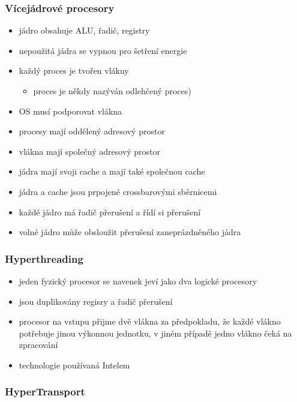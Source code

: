 \documentclass[a4paper,12pt]{article}
\providecommand{\tightlist}{%
\setlength{\itemsep}{0pt}\setlength{\parskip}{0pt}}
\begin{document}
\subsubsection{Vícejádrové procesory}

\begin{itemize}
\tightlist
\item jádro obsahuje ALU, řadič, registry
\item nepoužitá jádra se vypnou pro šetření energie
\item každý proces je tvořen vlákny

  \begin{itemize}
  \tightlist
  \item proces je někdy nazýván odlehčený proces)
  \end{itemize}
\item OS musí podporovat vlákna
\item procesy mají oddělený adresový prostor
\item vlákna mají společný adresový prostor
\item jádra mají svoji cache a mají také společnou cache
\item jádra a cache jsou prpojené crossbarovými sběrnicemi
\item každé jádro má řadič přerušení a řídí si přerušení
\item volné jádro může obsloužit přerušení zaneprázdněného jádra
\end{itemize}

\subsubsection{Hyperthreading}

\begin{itemize}
\tightlist
\item jeden fyzický procesor se navenek jeví jako dva logické procesory
\item jsou duplikovány regisry a řadič přerušení
\item procesor na vstupu přijme dvě vlákna za předpokladu, že každé vlákno
  potřebuje jinou výkonnou jednotku, v jiném případě jedno vlákno čeká
  na zpracování
\item technologie používaná Intelem
\end{itemize}

\subsubsection{HyperTransport}
\end{document}
